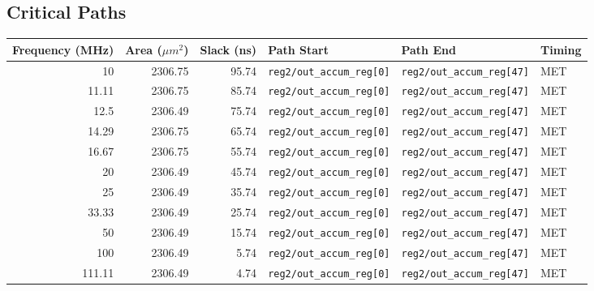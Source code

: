 \documentclass[a4paper,11pt]{article}
\begin{document}

\subsection{Critical Paths}

\begin{table}[htbp]
    \centering
    \scriptsize
    \begin{tabular}{r r r l l l}
        \toprule
        \textbf{Frequency (MHz)} &
        \textbf{Area ($\mu m^2$)} &
        \textbf{Slack (ns)} &
        \textbf{Path Start} &
        \textbf{Path End} &
        \textbf{Timing} \\
        \midrule
        10      & 2306.75 & 95.74  & \texttt{reg2/out\_accum\_reg[0]}  & \texttt{reg2/out\_accum\_reg[47]} & MET \\
        11.11   & 2306.75 & 85.74  & \texttt{reg2/out\_accum\_reg[0]}  & \texttt{reg2/out\_accum\_reg[47]} & MET \\
        12.5    & 2306.49 & 75.74  & \texttt{reg2/out\_accum\_reg[0]}  & \texttt{reg2/out\_accum\_reg[47]} & MET \\
        14.29   & 2306.75 & 65.74  & \texttt{reg2/out\_accum\_reg[0]}  & \texttt{reg2/out\_accum\_reg[47]} & MET \\
        16.67   & 2306.75 & 55.74  & \texttt{reg2/out\_accum\_reg[0]}  & \texttt{reg2/out\_accum\_reg[47]} & MET \\
        20      & 2306.49 & 45.74  & \texttt{reg2/out\_accum\_reg[0]}  & \texttt{reg2/out\_accum\_reg[47]} & MET \\
        25      & 2306.49 & 35.74  & \texttt{reg2/out\_accum\_reg[0]}  & \texttt{reg2/out\_accum\_reg[47]} & MET \\
        33.33   & 2306.49 & 25.74  & \texttt{reg2/out\_accum\_reg[0]}  & \texttt{reg2/out\_accum\_reg[47]} & MET \\
        50      & 2306.49 & 15.74  & \texttt{reg2/out\_accum\_reg[0]}  & \texttt{reg2/out\_accum\_reg[47]} & MET \\
        100     & 2306.49 & 5.74   & \texttt{reg2/out\_accum\_reg[0]}  & \texttt{reg2/out\_accum\_reg[47]} & MET \\
        111.11  & 2306.49 & 4.74   & \texttt{reg2/out\_accum\_reg[0]}  & \texttt{reg2/out\_accum\_reg[47]} & MET \\

\end{tabular}
\end{table}
\end{document}
